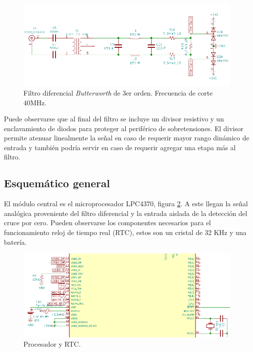 \begin{figure}[ht]
	\centering
	\includegraphics[width=140mm]{./Figures/schFiltro.png}
	\caption{Filtro diferencial \textit{Butterworth} de 3er orden. Frecuencia de corte 40MHz.}
	\label{fig:schFiltro}
\end{figure}


Puede observarse que al final del filtro se incluye un divisor resistivo y un enclavamiento de diodos para proteger al periférico de sobretensiones. El divisor permite atenuar linealmente la señal en caso de requerir mayor rango dinámico de entrada y también podría servir en caso de requerir agregar una etapa más al filtro.

\subsection{Esquemático general} 

El módulo central es el microprocesador LPC4370, figura \ref{fig:schCentral}. A este llegan la señal analógica proveniente del filtro diferencial y la entrada aislada de la detección del cruce por cero. Pueden observarse los componentes necesarios para el funcionamiento reloj de tiempo real (RTC), estos son un cristal de 32 KHz y una batería.


\begin{figure}[ht]
	\centering
	\includegraphics[width=140mm]{./Figures/schCentral.png}
	\caption{Procesador y RTC.}
	\label{fig:schCentral}
\end{figure}


